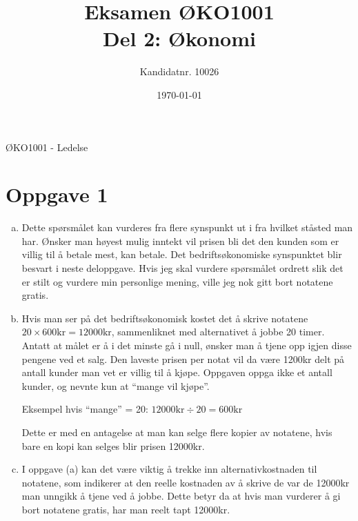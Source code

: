 \documentclass[a4paper, 12pt]{article}  %
\title{Eksamen ØKO1001\\Del 2: Økonomi} %
\author{Kandidatnr. 10026}              %
\date{\today}                           %
\begin{document}
\maketitle
\vfill
\begin{center}
  ØKO1001 - Ledelse
\end{center}
\thispagestyle{empty}
\addtocounter{page}{-1}
\newpage
\section*{Oppgave 1}

\begin{enumerate}[(a)]
  \item Dette spørsmålet kan vurderes fra flere synspunkt ut i fra hvilket ståsted man har. Ønsker man høyest mulig inntekt vil prisen bli det den kunden som er villig til å betale mest, kan betale. Det bedriftsøkonomiske synspunktet blir besvart i neste deloppgave. Hvis jeg skal vurdere spørsmålet ordrett slik det er stilt og vurdere min personlige mening, ville jeg nok gitt bort notatene gratis.

  \item Hvis man ser på det bedriftsøkonomisk kostet det å skrive notatene \(20 \times 600\textrm{kr} = 12000\textrm{kr}\), 
  sammenliknet med alternativet å jobbe 20 timer. Antatt at målet er å i det minste gå i null, ønsker man å tjene opp igjen disse pengene ved et salg. 
  Den laveste prisen per notat vil da være 1200kr delt på antall kunder man vet er villig til å kjøpe.  
  Oppgaven oppga ikke et antall kunder, og nevnte kun at ``mange vil kjøpe''. 
  
  Eksempel hvis ``mange'' = 20: \(12000\textrm{kr} \div 20 = 600\textrm{kr}\)

  Dette er med en antagelse at man kan selge flere kopier av notatene,
  hvis bare en kopi kan selges blir prisen 12000kr.

  \item I oppgave (a) kan det være viktig å trekke inn alternativkostnaden til notatene, som indikerer at den reelle kostnaden av å skrive de var de 12000kr man unngikk å tjene ved å jobbe. Dette betyr da at hvis man vurderer å gi bort notatene gratis, har man reelt tapt 12000kr.
\end{enumerate}

\newpage
\end{document}
